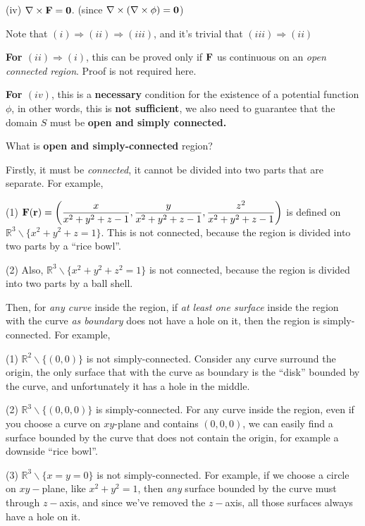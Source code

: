 \documentclass[11pt, a4paper]{MATH2023}
\newcommand{\rr}{{\bf r}}
\newcommand{\FF}{{\bf F}}
\begin{document}
\begin{spacing}{1.3}
    (iv) $\nabla \times \FF ={\bf 0}$. (since $\nabla \times (\nabla\times \phi)={\bf 0}$)

    {\blue Note that $(i)\Rightarrow (ii)\Rightarrow (iii)$, and it's trivial that $(iii)\Rightarrow (ii)$}

    \vspace{0.2in}
    {\bf For $(ii)\Rightarrow (i)$}, this can be proved only if $\FF$ us continuous on an {\it open connected region}.
    Proof is not required here.

    {\bf For $(iv)$}, this is a {\bf necessary} condition for the existence of a potential function $\phi$,
    in other words, this is {\bf not sufficient}, we also need to guarantee that the domain $S$ 
    must be {\bf open and simply connected.}

    \vspace{0.3in}
    What is {\bf open and simply-connected} region?

    Firstly, it must be {\it connected}, it cannot be divided into two parts that are separate. For example,

    (1) $\disp \FF(\rr)=\left(\frac{x}{x^2+y^2+z-1}, \frac{y}{x^2+y^2+z-1}, \frac{z^2}{x^2+y^2+z-1}\right)$
    is defined on $\mathbb{R}^3\backslash \{x^2+y^2+z=1\}$. This is not connected, because the region 
    is divided into two parts by a ``rice bowl''.

    (2) Also, $\mathbb{R}^3\backslash \{x^2+y^2+z^2=1\}$ is not connected, because the region 
    is divided into two parts by a ball shell.

    Then, for {\it any curve} inside the region, if {\it at least one surface} inside the region
    with the curve {\it as boundary}
    does not have a hole on it, then the region is simply-connected. For example,

    (1) $\mathbb{R}^2\backslash \{(0,0)\}$ is not simply-connected. Consider any curve surround the origin,
    the only surface that with the curve as boundary is the ``disk'' bounded by the curve, and unfortunately 
    it has a hole in the middle.

    (2) $\mathbb{R}^3\backslash \{(0,0,0)\}$ is simply-connected. For any curve inside the region, even if 
    you choose a curve on $xy$-plane and contains $(0,0,0)$, we can easily find a surface bounded by the 
    curve that does not contain the origin, for example a downside ``rice bowl''.

    (3) $\mathbb{R}^3\backslash \{x=y=0\}$ is not simply-connected. For example, if we choose a circle on 
    $xy-$plane, like $x^2+y^2=1$, then {\it any} surface bounded by the curve must through $z-$axis,
    and since we've removed the $z-$axis, all those surfaces always have a hole on it.


\end{spacing}
\end{document}
